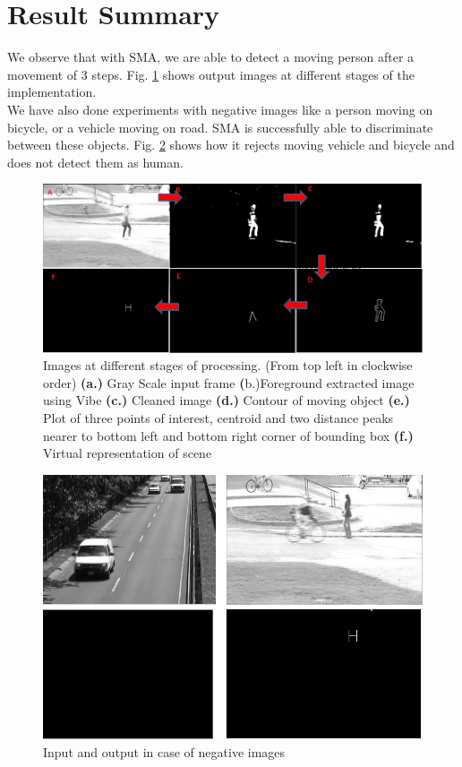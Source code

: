 \documentclass[a4paper, 12pt, twoside]{synopsis}  %
\begin{document}
\section {Result Summary}
\indent We observe that with SMA, we are able to detect a moving person
after a movement of 3 steps. Fig.  \ref{pipeline_images} shows output
images at different stages of the implementation.\\
\indent We have also done experiments with negative images like a person
moving on bicycle, or a vehicle moving on road. SMA is successfully able
to discriminate between these objects. Fig. \ref{negative_inputs} shows
how it rejects moving vehicle and bicycle and  does not detect them as
human.\\
\begin{figure}[!h]
\centering
\includegraphics[scale=0.30]{Figures/pipeline_images}
\caption{Images at different stages of processing. (From top left in
clockwise order) \textbf{(a.)} Gray Scale input frame
\textbf({b.)}Foreground extracted image using Vibe \textbf{(c.)} Cleaned
image \textbf{(d.)} Contour of moving object \textbf{(e.)} Plot of three points
of interest, centroid and two distance peaks nearer to bottom left and
bottom right corner of bounding box \textbf{(f.)} Virtual representation
of scene} 
\label{pipeline_images}
\end{figure}
\begin{figure}[!h]
\centering
\includegraphics[scale=0.30]{Figures/negative_inputs}
\caption{Input and output in case of negative images}
\label{negative_inputs}
\end{figure}
\end{document}

